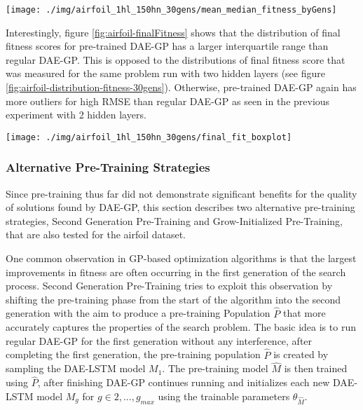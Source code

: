 \documentclass[
  11pt,
]{article}
\let\origfigure\figure
\let\endorigfigure\endfigure
\renewenvironment{figure}[1][2] {
    \expandafter\origfigure\expandafter[H]
} {
    \endorigfigure
}
\begin{document}
\begin{figure}[c]

{\centering \texttt{[image: ./img/airfoil\_1hl\_150hn\_30gens/mean\_median\_fitness\_byGens]} 

}

\caption{Fitness over 30 Generations - Airfoil - Single Hidden Layer}\label{fig:airfoil-fitness-perGen}
\end{figure}

Interestingly, figure \ref{fig:airfoil-finalFitness} shows that the distribution of final fitness scores for pre-trained DAE-GP has a larger interquartile range than regular DAE-GP. This is opposed to the distributions of final fitness score that was measured for the same problem run with two hidden layers (see figure \ref{fig:airfoil-distribution-fitness-30gens}). Otherwise, pre-trained DAE-GP again has more outliers for high RMSE than regular DAE-GP as seen in the previous experiment with 2 hidden layers.

\begin{figure}[c]

{\centering \texttt{[image: ./img/airfoil\_1hl\_150hn\_30gens/final\_fit\_boxplot]} 

}

\caption{Fitness after 30 Generations - Airfoil - Single Hidden Layer}\label{fig:airfoil-finalFitness}
\end{figure}

\hypertarget{alternative-pre-training-strategies}{%
\subsubsection{Alternative Pre-Training Strategies}\label{alternative-pre-training-strategies}}

Since pre-training thus far did not demonstrate significant benefits for the quality of solutions found by DAE-GP, this section describes two alternative pre-training strategies, Second Generation Pre-Training and Grow-Initialized Pre-Training, that are also tested for the airfoil dataset.

One common observation in GP-based optimization algorithms is that the largest improvements in fitness are often occurring in the first generation of the search process. Second Generation Pre-Training tries to exploit this observation by shifting the pre-training phase from the start of the algorithm into the second generation with the aim to produce a pre-training Population \(\hat{P}\) that more accurately captures the properties of the search problem. The basic idea is to run regular DAE-GP for the first generation without any interference, after completing the first generation, the pre-training population \(\hat{P}\) is created by sampling the DAE-LSTM model \(M_1\). The pre-training model \(\hat{M}\) is then trained using \(\hat{P}\), after finishing DAE-GP continues running and initializes each new DAE-LSTM model \(M_g\) for \(g\in{2,...,g_{max}}\) using the trainable parameters \(\theta_{\hat{M}}\).
\end{document}
